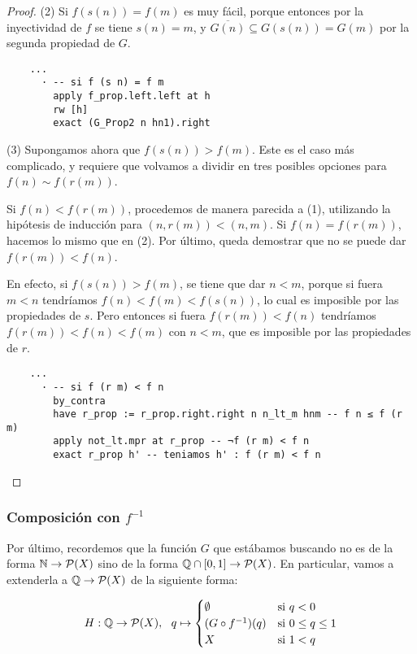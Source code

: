 \begin{proof}
  (2) Si $f(s(n)) = f(m)$ es muy fácil, porque entonces por la inyectividad de $f$ se tiene $s(n)= m$, y $\overline{G(n)} \subseteq G(s(n)) = G(m)$ por la segunda propiedad de $G$.

  \begin{lstlisting}
    ...
      · -- si f (s n) = f m
        apply f_prop.left.left at h
        rw [h]
        exact (G_Prop2 n hn1).right \end{lstlisting}

  (3) Supongamos ahora que $f(s(n))>f(m)$. Este es el caso más complicado, y requiere que volvamos a dividir en tres posibles opciones para $f(n) \sim f(r(m))$.
  
  Si $f(n) < f(r(m))$, procedemos de manera parecida a (1), utilizando la hipótesis de inducción para $(n, r(m)) < (n, m)$. Si $f(n) = f(r(m))$, hacemos lo mismo que en (2). Por último, queda demostrar que no se puede dar $f(r(m)) < f(n)$.

  En efecto, si $f(s(n))>f(m)$, se tiene que dar $n < m$, porque si fuera $m<n$ tendríamos $f(n) < f(m) < f(s(n))$, lo cual es imposible por las propiedades de $s$. Pero entonces si fuera $f(r(m)) < f(n)$ tendríamos $f(r(m)) < f(n) < f(m)$ con $n < m$, que es imposible por las propiedades de $r$.

  \begin{lstlisting}
    ...
      · -- si f (r m) < f n
        by_contra
        have r_prop := r_prop.right.right n n_lt_m hnm -- f n ≤ f (r m)
        apply not_lt.mpr at r_prop -- ¬f (r m) < f n
        exact r_prop h' -- teniamos h' : f (r m) < f n \end{lstlisting}
\end{proof}


\subsubsection{Composición con $f^{-1}$}

Por último, recordemos que la función $G$ que estábamos buscando no es de la forma $\mathbb{N} \to \mathcal{P}(X)$ sino de la forma $\mathbb{Q} \cap [0, 1] \to \mathcal{P}(X)$. En particular, vamos a extenderla a $\mathbb{Q} \to \mathcal{P}(X)$ de la siguiente forma:

$$
H : \mathbb{Q} \to \mathcal{P}(X), ~~ q \mapsto
\begin{cases}
\emptyset & \text{si } q < 0 \\
(G \circ f^{-1})(q) & \text{si } 0 \leq q \leq 1 \\
X & \text{si } 1 < q
\end{cases}
$$

